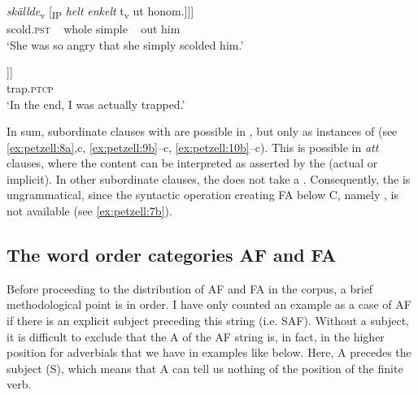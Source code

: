 \documentclass[output=paper,colorlinks,citecolor=brown,draft,draftmode]{langscibook}
\begin{document}
\gll     \textit{{skällde}}\textsubscript{v} [\textsubscript{IP} \textit{{helt}} \textit{{enkelt}} t\textsubscript{v}  ut    honom.]]]  \\
    scold.\textsc{pst} ~ whole simple ~  out  him\\
\glt `She was so angry that she simply scolded him.’  \\


\gll     [\textsubscript{CP}    att [\textsubscript{CP}  jag  \textit{{blev}}\textsubscript{v} [\textsubscript{IP}      \textit{{faktiskt}}  t\textsubscript{v}     \\
          ~ that   ~ I    become.\textsc{pst}   ~ actually ~ \\
\gll     instängd.]]]  \\
    trap.\textsc{ptcp}\\
\glt `In the end, I was actually trapped.’
\z
\z


In sum, subordinate clauses with  are possible in , but only as instances of  (see \ref{ex:petzell:8a},c, \ref{ex:petzell:9b}–c, \ref{ex:petzell:10b}–c). This is possible in \textit{att} clauses, where the content can be interpreted as asserted by the  (actual or implicit). In other subordinate clauses, the  does not take a  . Consequently, the  is ungrammatical, since the syntactic operation creating FA below C, namely  , is not available (see \ref{ex:petzell:7b}).


\subsection{The word order categories AF and FA}\label{sec:petzell:2.3}


Before proceeding to the distribution of AF and FA in the corpus, a brief methodological point is in order. I have only counted an example as a case of AF if there is an explicit subject preceding this string (i.e. SAF). Without a subject, it is difficult to exclude that the A of the AF string is, in fact, in the higher position for adverbials that we have in examples like  below. Here, A precedes the subject (S), which means that A can tell us nothing of the position of the finite verb.
\end{document}
